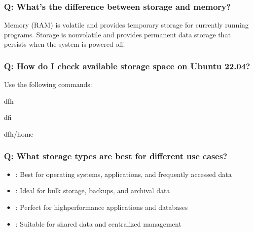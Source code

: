 \documentclass[letterpaper,10pt,english]{sphinxmanual}
\begin{document}
\subsubsection{Q: What’s the difference between storage and memory?}
\label{\detokenize{storage-overview:q-what-s-the-difference-between-storage-and-memory}}
\sphinxAtStartPar
{} Memory (RAM) is volatile and provides temporary storage for currently running programs. Storage is non\sphinxhyphen{}volatile and provides permanent data storage that persists when the system is powered off.


\subsubsection{Q: How do I check available storage space on Ubuntu 22.04?}
\label{\detokenize{storage-overview:q-how-do-i-check-available-storage-space-on-ubuntu-22-04}}
\sphinxAtStartPar
{} Use the following commands:

\begin{sphinxVerbatim}[commandchars=\\\{\}]
df\PYGZhy{}h

df\PYGZhy{}i

df\PYGZhy{}h/home
\end{sphinxVerbatim}


\subsubsection{Q: What storage types are best for different use cases?}
\label{\detokenize{storage-overview:q-what-storage-types-are-best-for-different-use-cases}}
\sphinxAtStartPar
{}
\begin{itemize}
\item {} 
\sphinxAtStartPar
{}: Best for operating systems, applications, and frequently accessed data

\item {} 
\sphinxAtStartPar
{}: Ideal for bulk storage, backups, and archival data

\item {} 
\sphinxAtStartPar
{}: Perfect for high\sphinxhyphen{}performance applications and databases

\item {} 
\sphinxAtStartPar
{}: Suitable for shared data and centralized management

\end{itemize}
\end{document}
